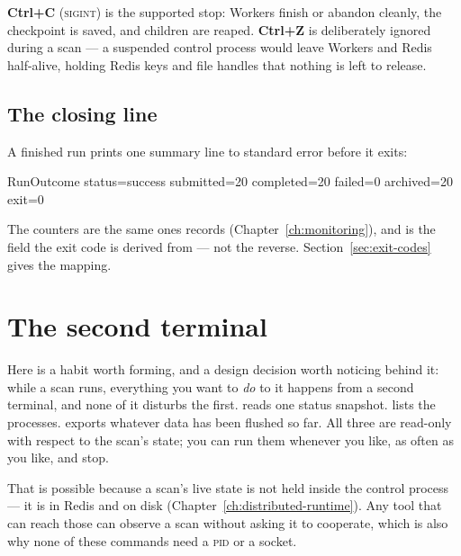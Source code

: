 \textbf{Ctrl+C} (\textsc{sigint}) is the supported stop: Workers finish or abandon
cleanly, the checkpoint is saved, and children are reaped. \textbf{Ctrl+Z} is
deliberately ignored during a scan --- a suspended control process would leave Workers
and Redis half-alive, holding Redis keys and file handles that nothing is left to
release.

\subsection{The closing line}

A finished run prints one summary line to standard error before it exits:

\begin{terminal}
\begin{jout}
RunOutcome status=success submitted=20 completed=20 failed=0 archived=20 exit=0
\end{jout}
\end{terminal}

The counters are the same ones  records
(Chapter~\ref{ch:monitoring}), and  is the field the exit code is derived
from --- not the reverse. Section~\ref{sec:exit-codes} gives the mapping.

\section{The second terminal}
\label{sec:cli-second-terminal}

Here is a habit worth forming, and a design decision worth noticing behind it: while a
scan runs, everything you want to \emph{do} to it happens from a second terminal, and
none of it disturbs the first.  reads one status snapshot.
 lists the processes.  exports whatever data has
been flushed so far. All three are read-only with respect to the scan's state; you can
run them whenever you like, as often as you like, and stop.

That is possible because a scan's live state is not held inside the control process ---
it is in Redis and on disk (Chapter~\ref{ch:distributed-runtime}). Any tool that can
reach those can observe a scan without asking it to cooperate, which is also why none of
these commands need a \textsc{pid} or a socket.

\subsection{}

